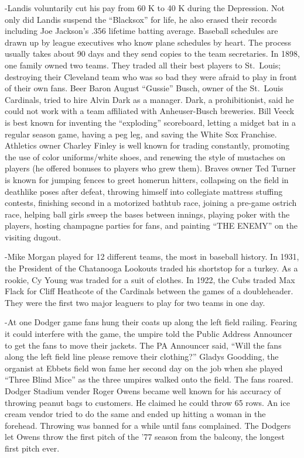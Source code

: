 \documentclass[
]{article}
\begin{document}
-Landis voluntarily cut his pay from 60 K to 40 K during the Depression.
Not only did Landis suspend the ``Blacksox'' for life, he also erased
their records including Joe Jackson's .356 lifetime batting average.
Baseball schedules are drawn up by league executives who know plane
schedules by heart. The process usually takes about 90 days and they
send copies to the team secretaries. In 1898, one family owned two
teams. They traded all their best players to St.~Louis; destroying their
Cleveland team who was so bad they were afraid to play in front of their
own fans. Beer Baron August ``Gussie'' Busch, owner of the St.~Louis
Cardinals, tried to hire Alvin Dark as a manager. Dark, a
prohibitionist, said he could not work with a team affiliated with
Anheuser-Busch breweries. Bill Veeck is best known for inventing the
``exploding'' scoreboard, letting a midget bat in a regular season game,
having a peg leg, and saving the White Sox Franchise. Athletics owner
Charley Finley is well known for trading constantly, promoting the use
of color uniforms/white shoes, and renewing the style of mustaches on
players (he offered bonuses to players who grew them). Braves owner Ted
Turner is known for jumping fences to greet homerun hitters, collapsing
on the field in deathlike poses after defeat, throwing himself into
collegiate mattress stuffing contests, finishing second in a motorized
bathtub race, joining a pre-game ostrich race, helping ball girls sweep
the bases between innings, playing poker with the players, hosting
champagne parties for fans, and painting ``THE ENEMY'' on the visiting
dugout.

-Mike Morgan played for 12 different teams, the most in baseball
history. In 1931, the President of the Chatanooga Lookouts traded his
shortstop for a turkey. As a rookie, Cy Young was traded for a suit of
clothes. In 1922, the Cubs traded Max Flack for Cliff Heathcote of the
Cardinals between the games of a doubleheader. They were the first two
major leaguers to play for two teams in one day.

-At one Dodger game fans hung their coats up along the left field
railing. Fearing it could interfere with the game, the umpire told the
Public Address Announcer to get the fans to move their jackets. The PA
Announcer said, ``Will the fans along the left field line please remove
their clothing?'' Gladys Goodding, the organist at Ebbets field won fame
her second day on the job when she played ``Three Blind Mice'' as the
three umpires walked onto the field. The fans roared. Dodger Stadium
vender Roger Owens became well known for his accuracy of throwing peanut
bags to customers. He claimed he could throw 65 rows. An ice cream
vendor tried to do the same and ended up hitting a woman in the
forehead. Throwing was banned for a while until fans complained. The
Dodgers let Owens throw the first pitch of the '77 season from the
balcony, the longest first pitch ever.
\end{document}

